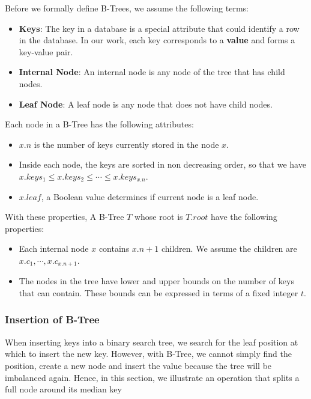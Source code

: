 Before we formally define B-Trees, we assume the following terms:

\begin{itemize}
\item
  \textbf{Keys}: The key in a database is a special attribute that could identify a row in the database. In our work, each key corresponds to a
  \textbf{value} and forms a key-value pair.
\item
  \textbf{Internal Node}: An internal node is any node of the tree that has child nodes.
\item
  \textbf{Leaf Node}: A leaf node is any node that does not have child nodes.
\end{itemize}

Each node in a B-Tree has the following attributes:

\begin{itemize}
\item
  $x.n$ is the number of keys currently stored in the node $x$.
\item
  Inside each node, the keys are sorted in non decreasing order, so that
  we have $x.keys_1\leq x.keys_2\leq\cdots\leq x.keys_{x.n}$.
\item
  $x.leaf$, a Boolean value determines if current node is a leaf node.
\end{itemize}

With these properties, A B-Tree $T$ whose root is $T.root$ have the
following properties:

\begin{itemize}
\item
  Each internal node $x$ contains $x.n+1$ children. We assume the
  children are $x.c_1,\cdots,x.c_{x.n+1}$.
\item
  The nodes in the tree have lower and upper bounds on the number of
  keys that can contain. These bounds can be expressed in terms of a
  fixed integer $t$.
\end{itemize}

\subsubsection{Insertion of B-Tree}

When inserting keys into a binary search tree, we search for the leaf
position at which to insert the new key. However, with B-Tree, we cannot
simply find the position, create a new node and insert the value because
the tree will be imbalanced again. Hence, in this section, we illustrate
an operation that splits a full node around its median key

